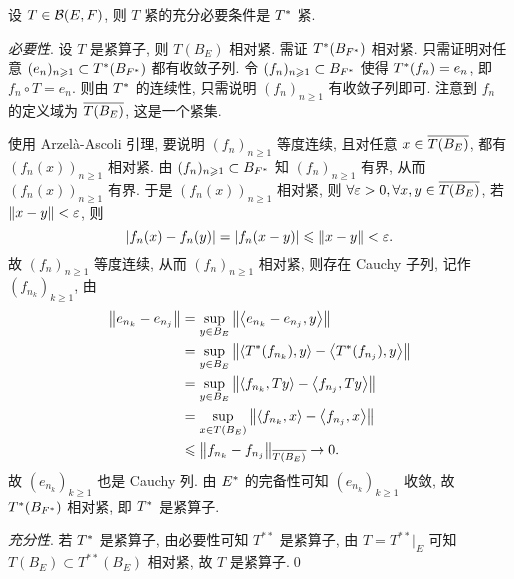     \begin{Theorem}
        设 $ T\in\CB(E, F) $, 则 $ T $ 紧的充分必要条件是 $ \Star{T} $ 紧.
    \end{Theorem}
    \begin{Proof}
        \textsl{必要性}. 设 $ T $ 是紧算子, 则 $ T(B_{E}) $ 相对紧. 需证 $ \Star{T}(B_{\Star{F}}) $ 相对紧. 只需证明对任意 $ (e_{n})_{n\geqslant1}\subset \Star{T}(B_{\Star{F}}) $ 都有收敛子列. 令 $ (f_{n})_{n\geqslant1}\subset B_{\Star{F}} $ 使得 $ \Star{T}(f_{n})=e_{n} $, 即 $ f_{n}\circ T=e_{n} $. 则由 $ \Star{T} $ 的连续性, 只需说明 $ (f_{n})_{n\geqslant1} $ 有收敛子列即可. 注意到 $ f_{n} $ 的定义域为 $ \baro{T(B_{E})} $, 这是一个紧集.

        使用 Arzel\`a-Ascoli 引理, 要说明 $ (f_{n})_{n\geqslant1} $ 等度连续, 且对任意 $ x\in\baro{T(B_{E})} $, 都有 $ (f_{n}(x))_{n\geqslant1} $ 相对紧. 由 $ (f_{n})_{n\geqslant1}\subset B_{\Star{F}} $ 知 $ (f_{n})_{n\geqslant1} $ 有界, 从而 $ (f_{n}(x))_{n\geqslant1} $ 有界. 于是 $ (f_{n}(x))_{n\geqslant1} $ 相对紧, 则 $ \forall\varepsilon>0, \forall x, y\in\baro{T(B_{E})} $, 若 $ \norm{x-y}<\varepsilon $, 则
        \[
            \abs{f_{n}(x)-f_{n}(y)} = \abs{f_{n}(x-y)}\leqslant\norm{x-y}<\varepsilon.
        \]
        故 $ (f_{n})_{n\geqslant1} $ 等度连续, 从而 $ (f_{n})_{n\geqslant1} $ 相对紧, 则存在 Cauchy 子列,
        记作 $ (f_{n_{k}})_{k\geqslant1} $, 由
        \[
            \begin{aligned}
                \norm{e_{n_{k}}-e_{n_{j}}} & = \sup_{y\in B_{E}}\norm{\lrangle{e_{n_{k}}-e_{n_{j}}, y}} \\
                & = \sup_{y\in B_{E}}\norm{\lrangle{\Star{T}(f_{n_{k}}), y}-\lrangle{\Star{T}(f_{n_{j}}), y}}\\
                & = \sup_{y\in B_{E}}\norm{\lrangle{f_{n_{k}}, Ty}-\lrangle{f_{n_{j}}, Ty}}\\
                & =  \sup_{x\in T(B_{E})}\norm{\lrangle{f_{n_{k}}, x}-\lrangle{f_{n_{j}}, x}}\\
                & \leqslant \norm{f_{n_{k}}-f_{n_{j}}}_{\baro{T(B_{E})}}\to 0.
            \end{aligned}
        \]
        故 $ (e_{n_{k}})_{k\geqslant1} $ 也是 Cauchy 列. 由 $ \Star{E} $ 的完备性可知 $ (e_{n_{k}})_{k\geqslant1} $ 收敛, 故 $ \Star{T}(B_{\Star{F}}) $ 相对紧, 即 $ \Star{T} $ 是紧算子.

        \textsl{充分性}. 若 $ \Star{T} $ 是紧算子, 由必要性可知 $ T^{**} $ 是紧算子, 由 $ T = T^{**}|_{E} $ 可知 $ T(B_{E})\subset T^{**}(B_{E}) $ 相对紧, 故 $ T $ 是紧算子.\qed
    \end{Proof}

